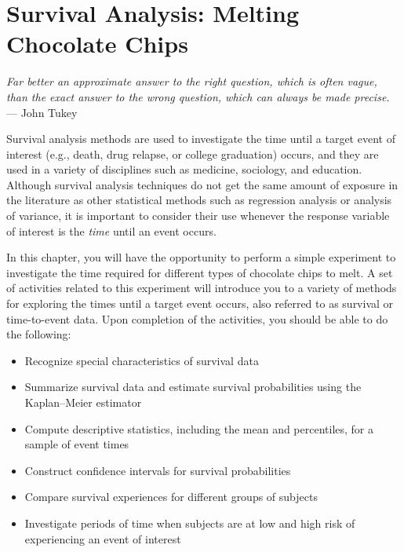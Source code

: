 \documentclass[
]{report}
\providecommand{\tightlist}{%
  \setlength{\itemsep}{0pt}\setlength{\parskip}{0pt}}
\begin{document}
\hypertarget{survival-analysis-melting-chocolate-chips}{%
\chapter{Survival Analysis: Melting Chocolate Chips}\label{survival-analysis-melting-chocolate-chips}}

\begin{flushright}
\emph{Far better an approximate answer to the right question, which is often vague, than the exact answer to the wrong question, which can always be made precise.} \\
— John Tukey
\end{flushright}

Survival analysis methods are used to investigate the time until a target event of interest (e.g., death, drug relapse, or college graduation) occurs, and they are used in a variety of disciplines such as medicine, sociology, and education. Although survival analysis techniques do not get the same amount of exposure in the literature as other statistical methods such as regression analysis or analysis of variance, it is important to consider their use whenever the response variable of interest is the \emph{time} until an event occurs.

In this chapter, you will have the opportunity to perform a simple experiment to investigate the time required for different types of chocolate chips to melt. A set of activities related to this experiment will introduce you to a variety of methods for exploring the times until a target event occurs, also referred to as survival or time-to-event data. Upon completion of the activities, you should be able to do the following:

\begin{itemize}
\tightlist
\item
  Recognize special characteristics of survival data\\
\item
  Summarize survival data and estimate survival probabilities using the Kaplan--Meier estimator\\
\item
  Compute descriptive statistics, including the mean and percentiles, for a sample of event times\\
\item
  Construct confidence intervals for survival probabilities\\
\item
  Compare survival experiences for different groups of subjects\\
\item
  Investigate periods of time when subjects are at low and high risk of experiencing an event of interest
\end{itemize}
\end{document}
